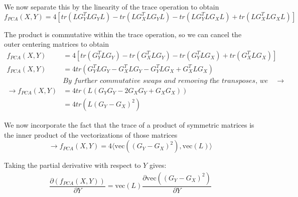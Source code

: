 \documentclass{article}
\theoremstyle{definition}
\begin{document}
We now separate this by the linearity of the trace operation to obtain
\[ f_{PCA}(X, Y) = 4 \left[ tr \left( L G_Y^T L G_Y L \right) - tr \left( L G_X^T L G_Y L \right) - tr \left( L G_Y^T L G_X L \right) + tr \left( L G_X^T L G_X L \right) \right] \]

The product is commutative within the trace operation, so we can cancel the outer centering matrices to obtain
\begin{align*}
f_{PCA}(X, Y) &= 4 \left[ tr \left( G_Y^T L G_Y \right) - tr \left( G_X^T L G_Y \right) - tr \left( G_Y^T L G_X \right) + tr \left( G_X^T L G_X \right) \right]
\\
f_{PCA}(X, Y) &= 4 tr \left( G_Y^T L G_Y - G_X^T L G_Y - G_Y^T L G_X + G_X^T L G_X \right) \\
&\textit{By further commutative swaps and removing the transposes, we get} \rightarrow \\
\rightarrow f_{PCA}(X, Y) &= 4 tr \left( L \left( G_Y G_Y - 2 G_X G_Y + G_X G_X \right) \right) \\
&= 4 tr \left( L \left( G_Y - G_X \right)^2 \right)
\end{align*}

We now incorporate the fact that the trace of a product of symmetric matrices is the inner product of the vectorizations of those matrices
\[ \rightarrow f_{PCA}(X, Y) = 4 \langle \text{vec}( (G_Y - G_X)^2 ), \text{vec}( L ) \rangle \]

Taking the partial derivative with respect to $Y$ gives:
\begin{align*}
    \dfrac{\partial(f_{PCA}(X, Y))}{\partial Y} = \text{vec}(L) \dfrac{\partial \text{vec}\left( (G_Y - G_X)^2 \right)}{\partial Y}
\end{align*}
\end{document}
